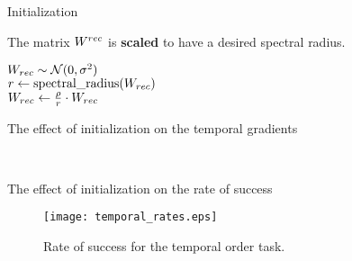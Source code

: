 \begin{frame}{Initialization}
	
The matrix $W^{rec}$ is \textbf{scaled} to have a desired spectral radius.

\vspace{2em}

\begin{algorithm}[H]
	\BlankLine
	
	$W_{rec} \sim \mathcal{N}(0, \sigma^2)$\\
	$r \gets \mbox{spectral\_radius}(W_{rec})$\\
	$W_{rec}\gets \frac{\rho}{r} \cdot W_{rec}$\\
	\caption{Recurrent weight matrix initialization scheme}
	\label{algo:init_scaling}
\end{algorithm}
\end{frame}

\begin{frame}{The effect of initialization on the temporal gradients}
	\captionsetup[subfigure]{labelformat=empty}
		\begin{figure}
			\centering
			\\
			\vspace{-2em}
		\end{figure}
	
\end{frame}

\begin{frame}{The effect of initialization on the rate of success}
	\begin{figure}
		\centering
%		
		\texttt{[image: temporal\_rates.eps]}
		\caption{Rate of success for the temporal order task.}
		\label{fig:temporal_rates}
	\end{figure}
\end{frame}


